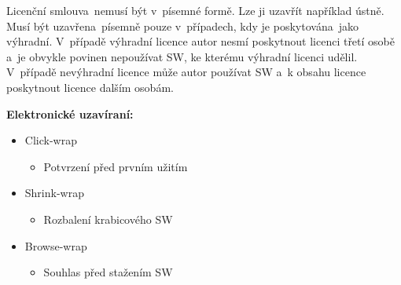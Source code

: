 Licenční smlouva~nemusí být v~písemné formě. Lze ji uzavřít například ústně. Musí být uzavřena~písemně pouze v~případech, kdy je poskytována~jako výhradní. V~případě výhradní licence autor nesmí poskytnout licenci třetí osobě a~je obvykle povinen nepoužívat SW, ke kterému výhradní licenci udělil. V~případě nevýhradní licence může autor používat SW a~k obsahu licence poskytnout licence dalším osobám. 
\newline

\noindent\textbf{Elektronické uzavíraní:}
\begin{itemize}[noitemsep]
    \item Click-wrap
    \begin{itemize}[noitemsep]
        \item Potvrzení před prvním užitím
    \end{itemize}
    \item Shrink-wrap
    \begin{itemize}[noitemsep]
        \item Rozbalení krabicového SW
    \end{itemize}
    \item Browse-wrap
    \begin{itemize}[noitemsep]
        \item Souhlas před stažením SW
    \end{itemize}
\end{itemize}


